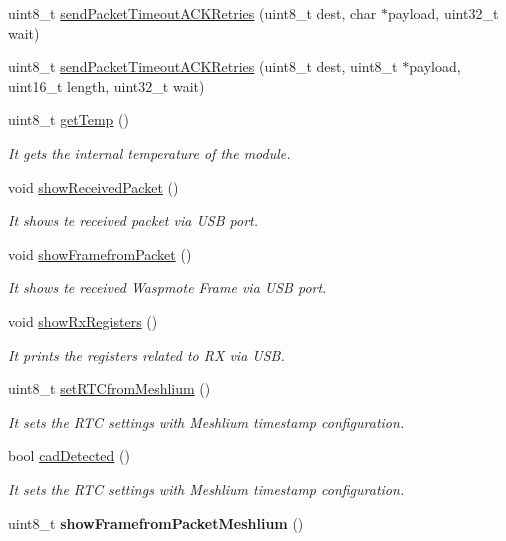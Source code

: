 \begin{DoxyCompactItemize}
uint8\+\_\+t \hyperlink{class_wasp_s_x1272_aaa7a8d46d26f447cf133e1424242ea50}{send\+Packet\+Timeout\+A\+C\+K\+Retries} (uint8\+\_\+t dest, char $\ast$payload, uint32\+\_\+t wait)
\item 
uint8\+\_\+t \hyperlink{class_wasp_s_x1272_a9b26c15d76cfd97ea23dfbede87ba030}{send\+Packet\+Timeout\+A\+C\+K\+Retries} (uint8\+\_\+t dest, uint8\+\_\+t $\ast$payload, uint16\+\_\+t length, uint32\+\_\+t wait)
\item 
uint8\+\_\+t \hyperlink{class_wasp_s_x1272_a193169393606b1ba294e39d42570897a}{get\+Temp} ()
\begin{DoxyCompactList}\small\item\em It gets the internal temperature of the module. \end{DoxyCompactList}\item 
void \hyperlink{class_wasp_s_x1272_ab136ac58860cfe670c0a8ee99e4aa9f6}{show\+Received\+Packet} ()
\begin{DoxyCompactList}\small\item\em It shows te received packet via U\+SB port. \end{DoxyCompactList}\item 
void \hyperlink{class_wasp_s_x1272_a277e2c8f44b88a0ab94ab5a0027fe347}{show\+Framefrom\+Packet} ()
\begin{DoxyCompactList}\small\item\em It shows te received Waspmote Frame via U\+SB port. \end{DoxyCompactList}\item 
void \hyperlink{class_wasp_s_x1272_a857569bb5f2063f714cc787437d069a4}{show\+Rx\+Registers} ()
\begin{DoxyCompactList}\small\item\em It prints the registers related to RX via U\+SB. \end{DoxyCompactList}\item 
uint8\+\_\+t \hyperlink{class_wasp_s_x1272_a1a32d15e142ef83b76edf83c67fe5d39}{set\+R\+T\+Cfrom\+Meshlium} ()
\begin{DoxyCompactList}\small\item\em It sets the R\+TC settings with Meshlium timestamp configuration. \end{DoxyCompactList}\item 
bool \hyperlink{class_wasp_s_x1272_ac6ad4c4e8f40848fcca34a9c21d35313}{cad\+Detected} ()
\begin{DoxyCompactList}\small\item\em It sets the R\+TC settings with Meshlium timestamp configuration. \end{DoxyCompactList}\item 
uint8\+\_\+t {\bfseries show\+Framefrom\+Packet\+Meshlium} ()\hypertarget{class_wasp_s_x1272_ade9008e2641ea8b5f33db1032c0b4b1c}{}\label{class_wasp_s_x1272_ade9008e2641ea8b5f33db1032c0b4b1c}

\end{DoxyCompactItemize}
